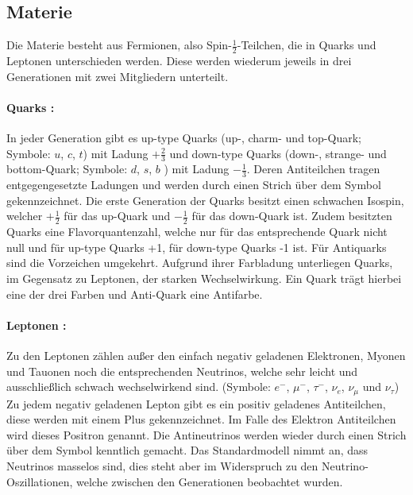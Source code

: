 \documentclass[
a4paper,                                %
twoside,                                %
BCOR1.4cm,                      %
ngerman,                                %
10pt,                           %
headings=normal,                %
headsepline,                    %
clearplainpage, %
final,                                  %
div=14,
parskip=full
]{scrbook}
\begin{document}
\subsection{Materie}

Die Materie besteht aus Fermionen, also Spin-$ \tfrac{1}{2} $-Teilchen, die in Quarks und Leptonen unterschieden werden. Diese werden wiederum jeweils in drei Generationen mit zwei Mitgliedern unterteilt. 

\paragraph*{Quarks :}

In jeder Generation gibt es up-type Quarks (up-, charm- und top-Quark; Symbole: 
$ u $, $ c $, $ t $) mit Ladung 
$ +\tfrac{2}{3} $ 
und down-type Quarks (down-, strange- und bottom-Quark; Symbole: 
$ d $, $ s $, $ b $ ) mit Ladung 
$ -\tfrac{1}{3} $. Deren Antiteilchen tragen entgegengesetzte Ladungen und werden durch einen Strich \"uber dem Symbol gekennzeichnet. Die erste Generation der Quarks besitzt einen schwachen Isospin, welcher 
$ +\tfrac{1}{2} $ 
f\"ur das up-Quark und 
$ -\tfrac{1}{2} $ 
f\"ur das down-Quark ist. Zudem besitzten Quarks eine Flavorquantenzahl, welche nur f\"ur das entsprechende Quark nicht null und f\"ur up-type Quarks +1, f\"ur down-type Quarks -1 ist. F\"ur Antiquarks sind die Vorzeichen umgekehrt. Aufgrund ihrer Farbladung unterliegen Quarks, im Gegensatz zu Leptonen, der starken Wechselwirkung. Ein Quark tr\"agt hierbei eine der drei Farben und Anti-Quark eine Antifarbe. \cite{Griffiths}

\paragraph*{Leptonen :}

Zu den Leptonen z\"ahlen au\ss er den einfach negativ geladenen Elektronen, Myonen und Tauonen noch die entsprechenden Neutrinos, welche sehr leicht und ausschlie\ss lich schwach wechselwirkend sind. (Symbole: $ e^{-} $, $ \mu^{-} $, $ \tau^{-} $, $ \nu_{e} $, $ \nu_{\mu} $ und  $ \nu_{\tau} $) Zu jedem negativ geladenen Lepton gibt es ein positiv geladenes Antiteilchen, diese werden mit einem Plus gekennzeichnet. Im Falle des Elektron Antiteilchen wird dieses Positron genannt. Die Antineutrinos werden wieder durch einen Strich \"uber dem Symbol kenntlich gemacht. Das Standardmodell nimmt an, dass  Neutrinos masselos sind, dies steht aber im Widerspruch zu den Neutrino-Oszillationen, welche zwischen den Generationen beobachtet wurden.
\end{document}
